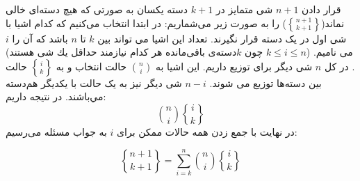 \p
 قرار دادن
$n+1$
شی متمایز در
$k+1$
دسته یکسان به صورتی که هیچ دسته‌ای خالی نماند($\genfrac{\{}{\}}{0pt}{}{n + 1}{k + 1}$) را به صورت زیر می‌شماریم:
در ابتدا انتخاب می‌کنیم که کدام اشیا با شی اول در یک دسته قرار نگیرند.
تعداد این اشیا می تواند بین
$k$ تا $n$ 
 باشد
 که آن را $i$ می نامیم.
 ($k \leq i \leq n$
چون $k$دسته‌ی باقی‌مانده هر کدام نیازمند حداقل يك شی هستند)
.
 در کل 
$n$ 
شی دیگر برای توزیع داریم. این اشیا به
${n\choose i}$ 
حالت انتخاب 
و به 
$\genfrac{\{}{\}}{0pt}{}{i}{k}$
حالت بین دسته‌ها توزیع می شوند.
$n-i$ 
شی دیگر نیز به یک حالت با یکدیگر هم‌دسته مي‌باشند. در نتیجه داریم:
$${n\choose i} \genfrac{\{}{\}}{0pt}{}{i}{k}$$
\p
در نهایت با جمع زدن همه حالات ممکن برای $i$ به جواب مسئله می‌رسیم:

$$\genfrac{\{}{\}}{0pt}{}{n + 1}{k + 1} = \sum\limits_{i=k}^{n} {n\choose i} \genfrac{\{}{\}}{0pt}{}{i}{k}$$




